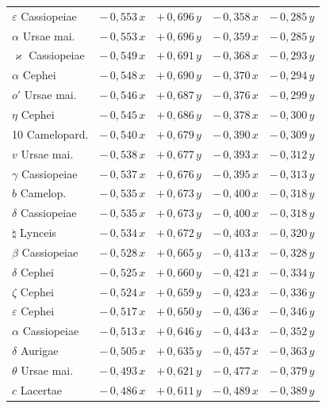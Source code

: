 \documentclass[12pt,a4paper]{article}
\theoremstyle{plain}
\theoremstyle{definition}
\theoremstyle{remark}
\begin{document}
{\begin{center}
\begin{tabular}{l|c c | c c}
$\varepsilon$ Cassiopeiae & $-\,0{,}553\,x$ & $+\,0{,}696\,y$ & $-\,0{,}358\,x$ & $-\,0{,}285\,y$ \\
$\alpha$ Ursae mai. & $-\,0{,}553\,x$ & $+\,0{,}696\,y$ & $-\,0{,}359\,x$ & $-\,0{,}285\,y$ \\
$\varkappa$ Cassiopeiae & $-\,0{,}549\,x$ & $+\,0{,}691\,y$ & $-\,0{,}368\,x$ & $-\,0{,}293\,y$ \\
\midrule
$\alpha$ Cephei & $-\,0{,}548\,x$ & $+\,0{,}690\,y$ & $-\,0{,}370\,x$ & $-\,0{,}294\,y$ \\
$o'$ Ursae mai. & $-\,0{,}546\,x$ & $+\,0{,}687\,y$ & $-\,0{,}376\,x$ & $-\,0{,}299\,y$ \\
$\eta$ Cephei & $-\,0{,}545\,x$ & $+\,0{,}686\,y$ & $-\,0{,}378\,x$ & $-\,0{,}300\,y$ \\
10 Camelopard. & $-\,0{,}540\,x$ & $+\,0{,}679\,y$ & $-\,0{,}390\,x$ & $-\,0{,}309\,y$ \\
$v$ Ursae mai. & $-\,0{,}538\,x$ & $+\,0{,}677\,y$ & $-\,0{,}393\,x$ & $-\,0{,}312\,y$ \\
\midrule
$\gamma$ Cassiopeiae & $-\,0{,}537\,x$ & $+\,0{,}676\,y$ & $-\,0{,}395\,x$ & $-\,0{,}313\,y$ \\
$b$ Camelop. & $-\,0{,}535\,x$ & $+\,0{,}673\,y$ & $-\,0{,}400\,x$ & $-\,0{,}318\,y$ \\
$\delta$ Cassiopeiae & $-\,0{,}535\,x$ & $+\,0{,}673\,y$ & $-\,0{,}400\,x$ & $-\,0{,}318\,y$ \\
$\natural$ Lynceis & $-\,0{,}534\,x$ & $+\,0{,}672\,y$ & $-\,0{,}403\,x$ & $-\,0{,}320\,y$ \\
$\beta$ Cassiopeiae & $-\,0{,}528\,x$ & $+\,0{,}665\,y$ & $-\,0{,}413\,x$ & $-\,0{,}328\,y$ \\
\midrule
$\delta$ Cephei & $-\,0{,}525\,x$ & $+\,0{,}660\,y$ & $-\,0{,}421\,x$ & $-\,0{,}334\,y$ \\
$\zeta$ Cephei & $-\,0{,}524\,x$ & $+\,0{,}659\,y$ & $-\,0{,}423\,x$ & $-\,0{,}336\,y$ \\
$\varepsilon$ Cephei & $-\,0{,}517\,x$ & $+\,0{,}650\,y$ & $-\,0{,}436\,x$ & $-\,0{,}346\,y$ \\
$\alpha$ Cassiopeiae & $-\,0{,}513\,x$ & $+\,0{,}646\,y$ & $-\,0{,}443\,x$ & $-\,0{,}352\,y$ \\
$\delta$ Aurigae & $-\,0{,}505\,x$ & $+\,0{,}635\,y$ & $-\,0{,}457\,x$ & $-\,0{,}363\,y$ \\
\midrule
$\theta$ Ursae mai. & $-\,0{,}493\,x$ & $+\,0{,}621\,y$ & $-\,0{,}477\,x$ & $-\,0{,}379\,y$ \\
$c$ Lacertae & $-\,0{,}486\,x$ & $+\,0{,}611\,y$ & $-\,0{,}489\,x$ & $-\,0{,}389\,y$ \\
\bottomrule
\end{tabular}
\end{center}
}
\end{document}
